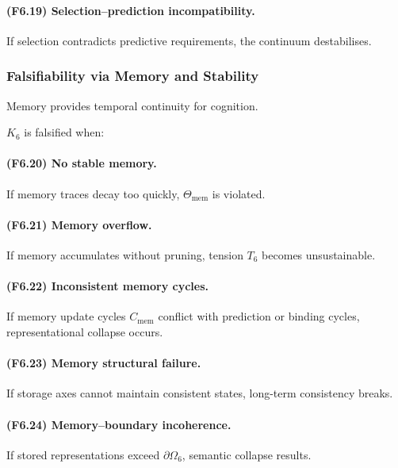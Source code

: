 \paragraph{(F6.19) Selection–prediction incompatibility.}
If selection contradicts predictive requirements,
the continuum destabilises.



\subsubsection{Falsifiability via Memory and Stability}

Memory provides temporal continuity for cognition.

$K_6$ is falsified when:

\paragraph{(F6.20) No stable memory.}
If memory traces decay too quickly,
$\Theta_{\mathrm{mem}}$ is violated.

\paragraph{(F6.21) Memory overflow.}
If memory accumulates without pruning,
tension $T_6$ becomes unsustainable.

\paragraph{(F6.22) Inconsistent memory cycles.}
If memory update cycles $C_{\mathrm{mem}}$ conflict with
prediction or binding cycles, representational collapse occurs.

\paragraph{(F6.23) Memory structural failure.}
If storage axes cannot maintain consistent states,
long-term consistency breaks.

\paragraph{(F6.24) Memory–boundary incoherence.}
If stored representations exceed $\partial\Omega_6$,
semantic collapse results.



